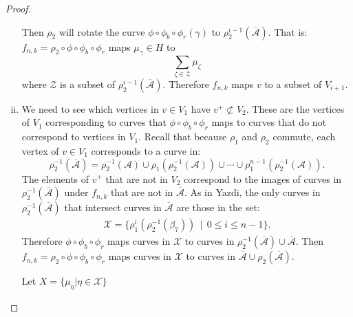 \begin{proof}
\begin{enumerate}[(i)]
  Then $\rho_2$ will rotate the curve $\phi\circ \phi_b\circ\phi_r(\gamma)$ to $\rho_2^{i-1}(\overline{\mathcal{A}})$. That is: $f_{n,k}=\rho_2\circ\phi\circ\phi_b\circ\phi_r$ maps $\mu_\gamma\in H$ to $$\sum_{\zeta\in \mathcal{Z}}\mu_\zeta$$ where $\mathcal{Z}$ is a subset of $\rho_2^{i-1}(\overline{\mathcal{A}})$.  Therefore $f_{n,k}$ maps $v$ to a subset of $V_{i+1}$.
\item We need to see which vertices in $v \in V_1$ have $v^+ \not\subset V_2$. These are the vertices of $V_1$ corresponding to curves that $\phi\circ\phi_b\circ\phi_r$ maps to curves that do not correspond to vertices in $V_1$.  Recall that because $\rho_1$ and $\rho_2$ commute, each vertex of $v\in V_1$ corresponds to a curve in: 
    $$\rho_2^{-1}(\overline{\mathcal{A}})=\rho_2^{-1}(\mathcal{A})\cup\rho_1(\rho_2^{-1}(\mathcal{A}))\cup\cdots\cup\rho_1^{n-1}(\rho_2^{-1}(\mathcal{A})).$$  The elements of $v^+$ that are not in $V_2$ correspond to the images of curves in $\rho_2^{-1}(\overline{\mathcal{A}})$ under $f_{n,k}$ that are not in $\overline{\mathcal{A}}$.  
As in Yazdi, the only curves in $\rho_2^{-1}(\overline{\mathcal{A}})$ that intersect curves in $\overline{\mathcal{A}}$ are those in the set: 
\begin{align*}
    \mathcal{X} = \{ \rho_1^i(\rho_2^{-1}(\beta_7))\,\mid\,0\leq i\leq n-1\}.
  \end{align*}
  Therefore $\phi\circ\phi_b\circ\phi_r$ maps curves in $\mathcal{X}$ to curves in $\rho_2^{-1}(\overline{\mathcal{A}})\cup\overline{\mathcal{A}}$.  Then $f_{n,k}=\rho_2\circ\phi\circ\phi_b\circ\phi_r$ maps curves in $\mathcal{X}$ to curves in $\overline{\mathcal{A}}\cup\rho_2(\overline{\mathcal{A}}).$

  Let $X=\{\mu_\eta|\eta\in\mathcal{X}\}$


\end{enumerate}
\end{proof}
